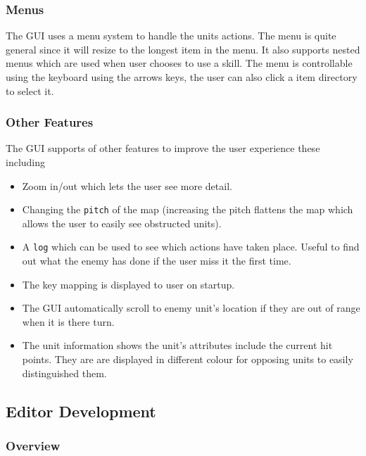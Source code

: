 
\subsubsection{Menus}

The GUI uses a menu system to handle the units actions. The menu is quite general since it will resize to the longest item in the menu.  It also supports nested menus which are used when user chooses to use a skill. The menu is controllable using the keyboard using the arrows keys, the user can also click a item directory to select it.



\subsubsection{Other Features}
The GUI supports of other features to improve the user experience these including

\begin{itemize}
	\item Zoom in/out which lets the user see more detail. 
	\item Changing the \texttt{pitch} of the map (increasing the pitch flattens the map which allows the user to easily see obstructed units).
	\item A \texttt{log} which can be used to see which actions have taken place. Useful to find out what the enemy has done if the user miss it the first time.
	\item The key mapping is displayed to user on startup.
	\item The GUI automatically scroll to enemy unit's location if they are out of range when it is there turn.
	\item The unit information shows the unit's attributes include the current hit points. They are are displayed in different colour for opposing units to easily distinguished them. 
\end{itemize}


\subsection{Editor Development}

\subsubsection{Overview}
\label{ssub:overview}

